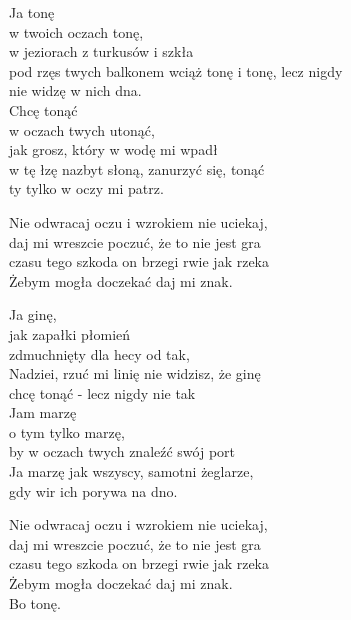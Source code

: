 \begin{text}
    \hfill\break
    Ja tonę\\
    w twoich oczach tonę,\\
    w jeziorach z turkusów i szkła\\
    pod rzęs twych balkonem wciąż tonę i tonę, lecz nigdy\\
    nie widzę w nich dna.\\
    Chcę tonąć\\
    w oczach twych utonąć,\\
    jak grosz, który w wodę mi wpadł\\
    w tę łzę nazbyt słoną, zanurzyć się, tonąć\\
    ty tylko w oczy mi patrz.

    Nie odwracaj oczu i wzrokiem nie uciekaj,\\
    daj mi wreszcie poczuć, że to nie jest gra\\
    czasu tego szkoda on brzegi rwie jak rzeka\\
    Żebym mogła doczekać daj mi znak.

    Ja ginę,\\
    jak zapałki płomień\\
    zdmuchnięty dla hecy od tak,\\
    Nadziei, rzuć mi linię nie widzisz, że ginę\\
    chcę tonąć - lecz nigdy nie tak\\
    Jam marzę\\
    o tym tylko marzę,\\
    by w oczach twych znaleźć swój port\\
    Ja marzę jak wszyscy, samotni żeglarze,\\
    gdy wir ich porywa na dno.

    Nie odwracaj oczu i wzrokiem nie uciekaj,\\
    daj mi wreszcie poczuć, że to nie jest gra\\
    czasu tego szkoda on brzegi rwie jak rzeka\\
    Żebym mogła doczekać daj mi znak.\\
    Bo tonę.
\end{text}
